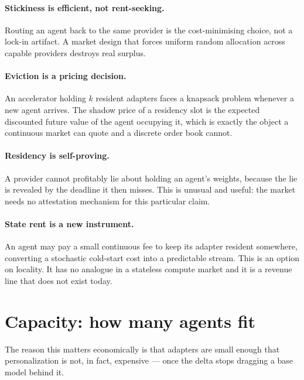 \documentclass[11pt,a4paper]{article}
\begin{document}
\paragraph{Stickiness is efficient, not rent-seeking.} Routing an agent back to
the same provider is the cost-minimising choice, not a lock-in artifact. A
market design that forces uniform random allocation across capable providers
destroys real surplus.

\paragraph{Eviction is a pricing decision.} An accelerator holding $k$ resident
adapters faces a knapsack problem whenever a new agent arrives. The shadow price
of a residency slot is the expected discounted future value of the agent
occupying it, which is exactly the object a continuous market can quote and a
discrete order book cannot.

\paragraph{Residency is self-proving.} A provider cannot profitably lie about
holding an agent's weights, because the lie is revealed by the deadline it then
misses. This is unusual and useful: the market needs no attestation mechanism
for this particular claim.

\paragraph{State rent is a new instrument.} An agent may pay a small continuous
fee to keep its adapter resident somewhere, converting a stochastic cold-start
cost into a predictable stream. This is an option on locality. It has no
analogue in a stateless compute market and it is a revenue line that does not
exist today.

\section{Capacity: how many agents fit}

The reason this matters economically is that adapters are small enough that
personalization is not, in fact, expensive --- once the delta stops dragging a
base model behind it.
\end{document}
